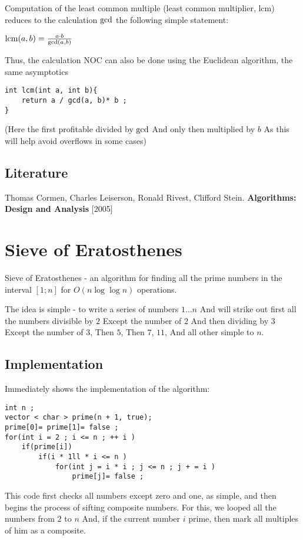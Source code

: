 Computation of the least common multiple (least common multiplier, lcm) reduces to the calculation $\rm gcd$ the following simple statement:

${\rm lcm}(a,b)=\frac{a\cdot b}{\gcd(a,b)}$

Thus, the calculation NOC can also be done using the Euclidean algorithm, the same asymptotics

\begin{verbatim}
int lcm(int a, int b){
    return a / gcd(a, b)* b ;
} 
\end{verbatim}
(Here the first profitable divided by $\rm gcd$ And only then multiplied by $b$ As this will help avoid overflows in some cases)

\subsection{ Literature }

Thomas Cormen, Charles Leiserson, Ronald Rivest, Clifford Stein. \textbf{Algorithms: Design and Analysis} [2005]
\section{ Sieve of Eratosthenes }
Sieve of Eratosthenes - an algorithm for finding all the prime numbers in the interval $[1; n]$ for $O (n \log \log n)$ operations.

The idea is simple - to write a series of numbers $1 \ldots n$ And will strike out first all the numbers divisible by $2$ Except the number of $2$ And then dividing by $3$ Except the number of $3$, Then $5$, Then $7$, $11$, And all other simple to $n$.

\subsection{ Implementation }

Immediately shows the implementation of the algorithm:

\begin{verbatim}
int n ;
vector < char > prime(n + 1, true);
prime[0]= prime[1]= false ;
for(int i = 2 ; i <= n ; ++ i )
    if(prime[i])
        if(i * 1ll * i <= n )
            for(int j = i * i ; j <= n ; j + = i )
                prime[j]= false ; 
\end{verbatim}
This code first checks all numbers except zero and one, as simple, and then begins the process of sifting composite numbers. For this, we looped all the numbers from $2$ to $n$ And, if the current number $i$ prime, then mark all multiples of him as a composite.

